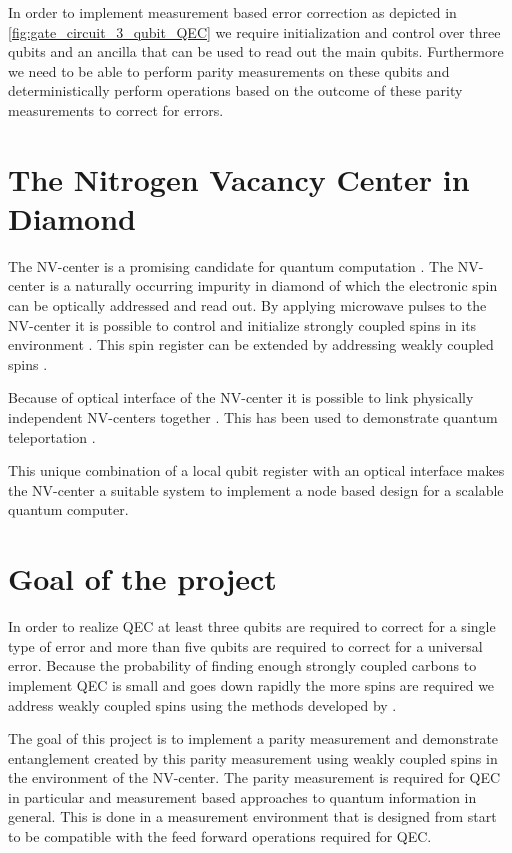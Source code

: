 In order to implement measurement based error correction as depicted in \cref{fig:gate_circuit_3_qubit_QEC} we require initialization and control over three qubits and an ancilla that can be used to read out the main qubits.
Furthermore we need to be able to perform parity measurements on these qubits and deterministically perform operations based on the outcome of these parity measurements to correct for errors.

\section{The Nitrogen Vacancy Center in Diamond}
The NV-center is a promising candidate for quantum computation \citep{Childress2013Diamond}.
The NV-center is a naturally occurring impurity in diamond of which the electronic spin can be optically addressed and read out.
By applying microwave pulses to the NV-center it is possible to control and initialize strongly coupled spins in its environment \citep{Robledo2011HighFidelity}.
This spin register can be extended by addressing weakly coupled spins \citep{Taminiau2014Universal,Waldherr2014Quantum}.

Because of optical interface of the NV-center it is possible to link physically independent NV-centers together \citep{Bernien2013Heralded}. This has been used to demonstrate quantum teleportation \citep{Pfaff2014Unconditional}.

This unique combination of a local qubit register with an optical interface makes the NV-center a suitable system to implement a node based design for a scalable quantum computer\citep{Nickerson2013Topological}.

\section{Goal of the project}
In order to realize QEC at least three qubits are required to correct for a single type of error and more than five qubits are required to correct for a universal error.
Because the probability of finding enough strongly coupled carbons to implement QEC is small and goes down rapidly the more spins are required \citep{Waldherr2014Quantum,Taminiau2014Universal} we address weakly coupled spins using the methods developed by \citet{Taminiau2014Universal}.

The goal of this project is to implement  a parity measurement and demonstrate entanglement created by this parity measurement using weakly coupled spins in the environment of the NV-center.
The parity measurement is required for QEC in particular and measurement based approaches to quantum information in general.
This is done in a measurement environment that is designed from start to be compatible with the feed forward operations required for QEC.

